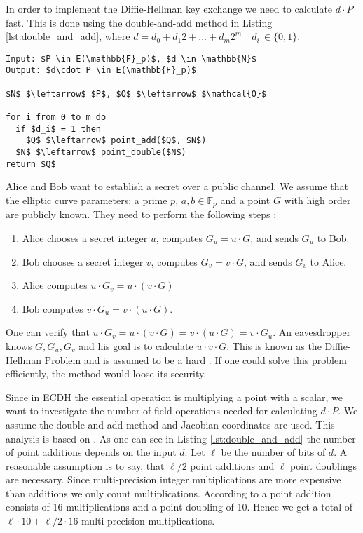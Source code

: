 In order to implement the Diffie-Hellman key exchange we need to calculate $d \cdot P$ fast. This is done using the double-and-add method in Listing \ref{lst:double_and_add}, where $d = d_0 + d_1 2 + ... + d_m 2^m \quad d_i \, \in \{0,1\}$.


\begin{lstlisting}[frame=single, mathescape=true, captionpos=b, caption=double-and-add method \cite{double_and_add}, label=lst:double_and_add]
Input: $P \in E(\mathbb{F}_p)$, $d \in \mathbb{N}$
Output: $d\cdot P \in E(\mathbb{F}_p)$

$N$ $\leftarrow$ $P$, $Q$ $\leftarrow$ $\mathcal{O}$

for i from 0 to m do
  if $d_i$ = 1 then
    $Q$ $\leftarrow$ point_add($Q$, $N$)
  $N$ $\leftarrow$ point_double($N$)
return $Q$
\end{lstlisting}

Alice and Bob want to establish a secret over a public channel. We assume that the elliptic curve parameters: a prime $p$, $a, b \in \mathbb{F}_p$ and a point $G$ with high order are publicly known. They need to perform the following steps \cite{Washington:2008}: 
\begin{enumerate}
\item{Alice chooses a secret integer $u$, computes $G_u = u \cdot G$, and sends $G_u$ to Bob.}
\item{Bob chooses a secret integer $v$, computes $G_v = v \cdot G$, and sends $G_v$ to Alice.}
\item{Alice computes $u \cdot G_v = u \cdot (v \cdot G)$}
\item{Bob computes $v \cdot G_u = v \cdot (u \cdot G)$.}
\end{enumerate}
One can verify that $u \cdot G_v = u \cdot (v \cdot G) = v\cdot (u \cdot G) = v \cdot G_u$. An eavesdropper knows $G, G_u, G_v$ and his goal is to calculate $u \cdot v \cdot G$. This is known as the Diffie-Hellman Problem and is assumed to be a hard \cite{Washington:2008}. If one could solve this problem efficiently, the method would loose its security.

Since in ECDH the essential operation is multiplying a point with a scalar, we want to investigate the number of field operations needed for calculating $d \cdot P$. We assume the double-and-add method and Jacobian coordinates are used. This analysis is based on \cite[p. 63]{Blake:1999}. As one can see in Listing \ref{lst:double_and_add} the number of point additions depends on the input $d$. Let $\ell$ be the number of bits of $d$. A reasonable assumption is to say, that $\ell / 2$ point additions and $\ell$ point doublings are necessary. Since multi-precision integer multiplications are more expensive than additions we only count multiplications. According to \cite[p. 59, 60]{Blake:1999} a point addition consists of 16 multiplications and a point doubling of 10. Hence we get a total of $\ell \cdot 10 + \ell / 2 \cdot 16$ multi-precision multiplications.

